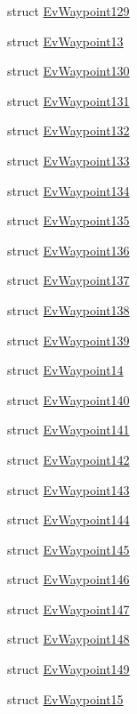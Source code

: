\begin{DoxyCompactItemize}
struct \hyperlink{structsmacc_1_1EvWaypoint129}{Ev\+Waypoint129}
\item 
struct \hyperlink{structsmacc_1_1EvWaypoint13}{Ev\+Waypoint13}
\item 
struct \hyperlink{structsmacc_1_1EvWaypoint130}{Ev\+Waypoint130}
\item 
struct \hyperlink{structsmacc_1_1EvWaypoint131}{Ev\+Waypoint131}
\item 
struct \hyperlink{structsmacc_1_1EvWaypoint132}{Ev\+Waypoint132}
\item 
struct \hyperlink{structsmacc_1_1EvWaypoint133}{Ev\+Waypoint133}
\item 
struct \hyperlink{structsmacc_1_1EvWaypoint134}{Ev\+Waypoint134}
\item 
struct \hyperlink{structsmacc_1_1EvWaypoint135}{Ev\+Waypoint135}
\item 
struct \hyperlink{structsmacc_1_1EvWaypoint136}{Ev\+Waypoint136}
\item 
struct \hyperlink{structsmacc_1_1EvWaypoint137}{Ev\+Waypoint137}
\item 
struct \hyperlink{structsmacc_1_1EvWaypoint138}{Ev\+Waypoint138}
\item 
struct \hyperlink{structsmacc_1_1EvWaypoint139}{Ev\+Waypoint139}
\item 
struct \hyperlink{structsmacc_1_1EvWaypoint14}{Ev\+Waypoint14}
\item 
struct \hyperlink{structsmacc_1_1EvWaypoint140}{Ev\+Waypoint140}
\item 
struct \hyperlink{structsmacc_1_1EvWaypoint141}{Ev\+Waypoint141}
\item 
struct \hyperlink{structsmacc_1_1EvWaypoint142}{Ev\+Waypoint142}
\item 
struct \hyperlink{structsmacc_1_1EvWaypoint143}{Ev\+Waypoint143}
\item 
struct \hyperlink{structsmacc_1_1EvWaypoint144}{Ev\+Waypoint144}
\item 
struct \hyperlink{structsmacc_1_1EvWaypoint145}{Ev\+Waypoint145}
\item 
struct \hyperlink{structsmacc_1_1EvWaypoint146}{Ev\+Waypoint146}
\item 
struct \hyperlink{structsmacc_1_1EvWaypoint147}{Ev\+Waypoint147}
\item 
struct \hyperlink{structsmacc_1_1EvWaypoint148}{Ev\+Waypoint148}
\item 
struct \hyperlink{structsmacc_1_1EvWaypoint149}{Ev\+Waypoint149}
\item 
struct \hyperlink{structsmacc_1_1EvWaypoint15}{Ev\+Waypoint15}

\end{DoxyCompactItemize}
